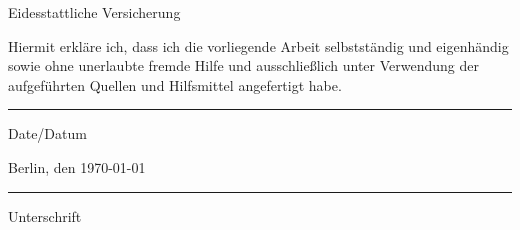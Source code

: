 \begin{titlepage}
\begin{center}{Eidesstattliche Versicherung}
\end{center}
Hiermit erkl\"are ich, dass ich die vorliegende Arbeit selbstst\"andig und 
eigenh\"andig sowie ohne unerlaubte fremde Hilfe und ausschlie\ss{}lich 
unter Verwendung der aufgef\"uhrten Quellen und Hilfsmittel angefertigt habe. 
\vfill
\begin{center}
\noindent
\begin{minipage}{0.5\textwidth}
\begin{flushleft}
\rule{5cm}{0.4pt}
Date/Datum 
\end{flushleft}
\end{minipage}%
\begin{minipage}{0.5\textwidth}
\begin{flushright} 
Berlin, den \today \\
\rule{5cm}{0.4pt}
Unterschrift
\end{flushright}
\end{minipage}


\end{center}
\end{titlepage}
